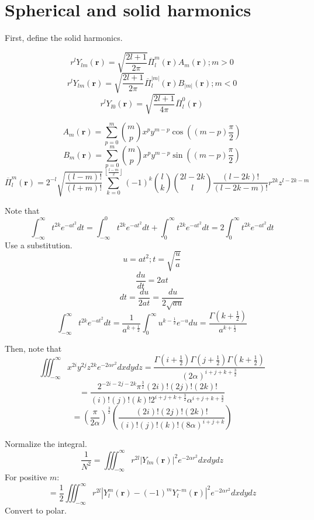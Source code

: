 \documentclass[12pt]{article}
\begin{document}

\section*{Spherical and solid harmonics}

First, define the solid harmonics.

$$r^l Y_{lm}(\mathbf{r}) = \sqrt{\frac{2l + 1}{2\pi}} \overline{\Pi}_l^m(\mathbf{r}) A_m(\mathbf{r}); m > 0$$
$$r^l Y_{lm}(\mathbf{r}) = \sqrt{\frac{2l + 1}{2\pi}} \overline{\Pi}_l^{|m|}(\mathbf{r}) B_{|m|}(\mathbf{r}); m < 0$$
$$r^l Y_{l0}(\mathbf{r}) = \sqrt{\frac{2l + 1}{4\pi}} \overline{\Pi}_l^0(\mathbf{r})$$

$$A_m(\mathbf{r}) = \sum_{p = 0}^m {m \choose p} x^p y^{m - p} \cos\left((m - p)\frac{\pi}{2}\right)$$
$$B_m(\mathbf{r}) = \sum_{p = 0}^m {m \choose p} x^p y^{m - p} \sin\left((m - p)\frac{\pi}{2}\right)$$
$$\overline{\Pi}_l^m(\mathbf{r}) = 2^{-l} \sqrt{\frac{(l - m)!}{(l + m)!}} \sum_{k = 0}^{\left\lfloor\frac{l - m}{2}\right\rfloor}(-1)^k {l \choose k} {2l - 2k \choose l} \frac{(l - 2k)!}{(l - 2k - m)!} r^{2k} z^{l - 2k - m}$$

Note that
$$\int_{-\infty}^\infty t^{2k} e^{-at^2} dt = \int_{-\infty}^0 t^{2k} e^{-at^2} dt + \int_0^\infty t^{2k} e^{-at^2} dt = 2\int_0^\infty t^{2k} e^{-at^2} dt$$
Use a substitution.
$$u = at^2; t = \sqrt{\frac{u}{a}}$$
$$\frac{du}{dt} = 2at$$
$$dt = \frac{du}{2at} = \frac{du}{2\sqrt{au}}$$
$$\int_{-\infty}^\infty t^{2k}e^{-at^2} dt = \frac{1}{a^{k + \frac{1}{2}}} \int_0^\infty u^{k-\frac{1}{2}} e^{-u} du = \frac{\Gamma\left(k + \frac{1}{2}\right)}{a^{k + \frac{1}{2}}}$$

Then, note that
$$\iiint_{-\infty}^\infty x^{2i}y^{2j}z^{2k} e^{-2\alpha r^2} dxdydz = \frac{\Gamma\left(i + \frac{1}{2}\right)\Gamma\left(j + \frac{1}{2}\right)\Gamma\left(k + \frac{1}{2}\right)}{(2\alpha)^{i + j + k + \frac{3}{2}}}$$
$$ = \frac{2^{-2i - 2j - 2k} \pi^{\frac{3}{2}} (2i)!(2j)!(2k)!}{(i)!(j)!(k)! 2^{i + j + k + \frac{3}{2}} \alpha^{i + j + k + \frac{3}{2}}}$$
$$ = \left(\frac{\pi}{2\alpha}\right)^{\frac{3}{2}} \left(\frac{(2i)!(2j)!(2k)!}{(i)!(j)!(k)! (8\alpha)^{i + j + k}}\right)$$

Normalize the integral.
$$\frac{1}{N^2} = \iiint_{-\infty}^\infty r^{2l} \left|Y_{lm}(\mathbf{r})\right|^2 e^{-2\alpha r^2} dxdydz$$
For positive $m$:
$$ = \frac{1}{2}\iiint_{-\infty}^\infty r^{2l} \left|Y_l^m(\mathbf{r})- (-1)^m Y_l^{-m}(\mathbf{r})\right|^2 e^{-2\alpha r^2} dxdydz$$
Convert to polar.
\end{document}
